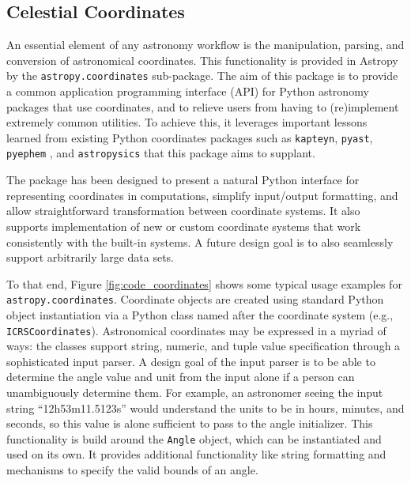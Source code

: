 \documentclass[traditabstract]{aa}
\begin{document}
\subsection{Celestial Coordinates}

\label{sec:coordinates}


An essential element of any astronomy workflow is the manipulation, parsing,
and conversion of astronomical coordinates. This functionality is provided in
Astropy by the \texttt{astropy.coordinates} sub-package. The aim of this
package is to provide a common application programming interface (API) for
Python astronomy packages that use coordinates, and to relieve users from
having to (re)implement extremely common utilities. To achieve this, it
leverages important lessons learned from existing Python coordinates packages
such as \texttt{kapteyn}, \texttt{pyast}, \texttt{pyephem} \citep{pyephem},
and \texttt{astropysics} \citep{astropysics} that this package aims to
supplant.

The package has been designed to present a natural Python interface for
representing coordinates in computations, simplify input/output formatting,
and allow straightforward transformation between coordinate systems. It also
supports implementation of new or custom coordinate systems that work
consistently with the built-in systems. A future design goal is to also
seamlessly support arbitrarily large data sets.

To that end, Figure \ref{fig:code_coordinates} shows some typical usage
examples for \texttt{astropy.coordinates}. Coordinate objects are created
using standard Python object instantiation via a Python class named after the
coordinate system (e.g., \texttt{ICRSCoordinates}). Astronomical coordinates
may be expressed in a myriad of ways: the classes support string, numeric, and
tuple value specification through a sophisticated input parser. A design goal
of the input parser is to be able to determine the angle value and unit from
the input alone if a person can unambiguously determine them. For example, an
astronomer seeing the input string ``12h53m11.5123s'' would understand the
units to be in hours, minutes, and seconds, so this value is alone sufficient
to pass to the angle initializer. This functionality is build around the
\texttt{Angle} object, which can be instantiated and used on its own. It
provides additional functionality like string formatting and mechanisms to
specify the valid bounds of an angle.
\end{document}
